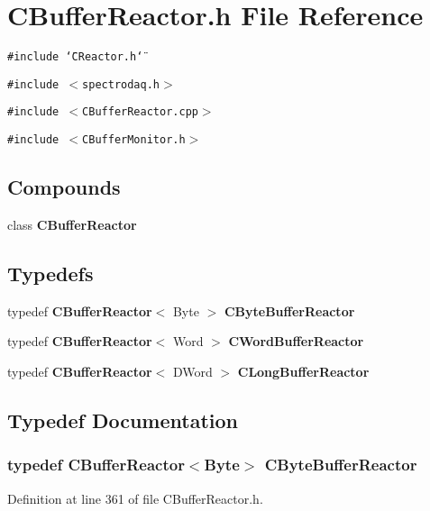 \section{CBuffer\-Reactor.h File Reference}
\label{CBufferReactor_8h}
{\tt \#include \char`\"{}CReactor.h\char`\"{}}\par
{\tt \#include $<$spectrodaq.h$>$}\par
{\tt \#include $<$CBuffer\-Reactor.cpp$>$}\par
{\tt \#include $<$CBuffer\-Monitor.h$>$}\par
\subsection*{Compounds}
\begin{CompactItemize}
\item 
class {\bf CBuffer\-Reactor}
\end{CompactItemize}
\subsection*{Typedefs}
\begin{CompactItemize}
\item 
typedef {\bf CBuffer\-Reactor}$<$ Byte $>$ {\bf CByte\-Buffer\-Reactor}
\item 
typedef {\bf CBuffer\-Reactor}$<$ Word $>$ {\bf CWord\-Buffer\-Reactor}
\item 
typedef {\bf CBuffer\-Reactor}$<$ DWord $>$ {\bf CLong\-Buffer\-Reactor}
\end{CompactItemize}


\subsection{Typedef Documentation}
\subsubsection{\setlength{\rightskip}{0pt plus 5cm}typedef {\bf CBuffer\-Reactor}$<$Byte$>$ CByte\-Buffer\-Reactor}\label{CBufferReactor_8h_a0}




Definition at line 361 of file CBuffer\-Reactor.h.
